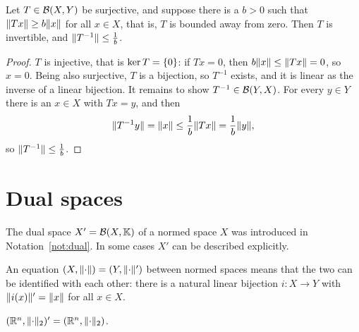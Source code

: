\begin{proposition}\label{prop:bounded-below}
Let $T \in \mathcal{B}(X, Y)$ be surjective, and suppose there is a $b > 0$ such
that $\lVert Tx\rVert \ge b\lVert x\rVert$ for all $x \in X$, that is, $T$ is bounded
away from zero. Then $T$ is invertible, and $\lVert T^{-1}\rVert \le \frac{1}{b}$.
\end{proposition}

\begin{proof}
$T$ is injective, that is $\ker T = \{0\}$: if $Tx = 0$, then
$b\lVert x\rVert \le \lVert Tx\rVert = 0$, so $x = 0$. Being also surjective, $T$ is a
bijection, so $T^{-1}$ exists, and it is linear as the inverse of a linear
bijection. It remains to show $T^{-1} \in \mathcal{B}(Y, X)$. For every $y \in Y$
there is an $x \in X$ with $Tx = y$, and then
\[
  \lVert T^{-1} y\rVert = \lVert x\rVert \le \frac{1}{b}\lVert Tx\rVert = \frac{1}{b}\lVert y\rVert,
\]
so $\lVert T^{-1}\rVert \le \frac{1}{b}$.
\end{proof}

\section{Dual spaces}

The dual space $X' = \mathcal{B}(X, \mathbb{K})$ of a normed space $X$ was introduced in
Notation~\ref{not:dual}. In some cases $X'$ can be described explicitly.

\begin{remark}\label{rem:identify}
An equation $(X, \lVert\cdot\rVert) = (Y, \lVert\cdot\rVert')$ between normed spaces
means that the two can be identified with each other: there is a natural
linear bijection $i \colon X \to Y$ with $\lVert i(x)\rVert' = \lVert x\rVert$ for all
$x \in X$.
\end{remark}

\begin{theorem}\label{thm:dual-Rn}
$(\mathbb{R}^n, \lVert\cdot\rVert_2)' = (\mathbb{R}^n, \lVert\cdot\rVert_2)$.
\end{theorem}

